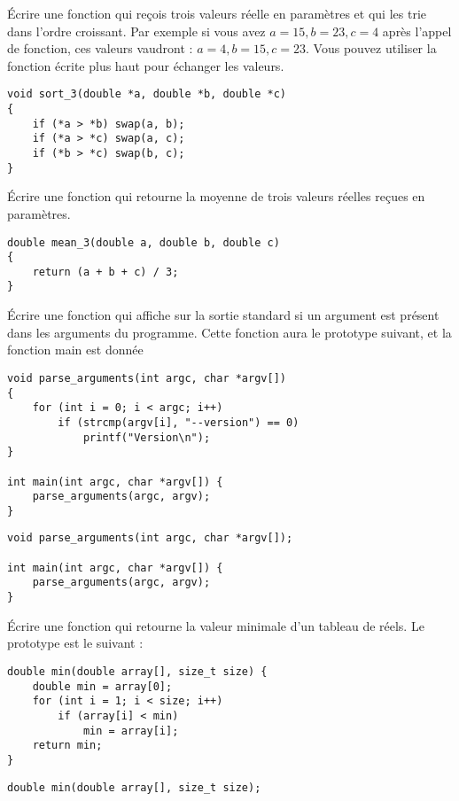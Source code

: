\documentclass[french,a4paper,addpoints,11pt]{exam}
\begin{document}
\begin{questions}
\question Écrire une fonction qui reçois trois valeurs réelle en paramètres et qui les trie dans l'ordre croissant. Par exemple si vous avez $a=15, b=23, c=4$ après l'appel de fonction, ces valeurs vaudront : $a=4, b=15, c=23$. Vous pouvez utiliser la fonction  écrite plus haut pour échanger les valeurs.

\begin{solutionordottedlines}[7cm]
\begin{lstlisting}
void sort_3(double *a, double *b, double *c)
{
    if (*a > *b) swap(a, b);
    if (*a > *c) swap(a, c);
    if (*b > *c) swap(b, c);
}
\end{lstlisting}
\end{solutionordottedlines}

\question Écrire une fonction qui retourne la moyenne de trois valeurs réelles reçues en paramètres. 

\begin{solutionordottedlines}[6cm]
\begin{lstlisting}
double mean_3(double a, double b, double c)
{
    return (a + b + c) / 3;
}
\end{lstlisting}
\end{solutionordottedlines}

\question Écrire une fonction qui affiche  sur la sortie standard si un argument  est présent dans les arguments du programme. Cette fonction aura le prototype suivant, et la fonction main est donnée

\ifprintanswers
\begin{solution}
\begin{lstlisting}
void parse_arguments(int argc, char *argv[])
{
    for (int i = 0; i < argc; i++)
        if (strcmp(argv[i], "--version") == 0)
            printf("Version\n");
}

int main(int argc, char *argv[]) {
    parse_arguments(argc, argv);
}
\end{lstlisting}
\end{solution}
\else
\begin{lstlisting}
void parse_arguments(int argc, char *argv[]);

int main(int argc, char *argv[]) {
    parse_arguments(argc, argv);
}
\end{lstlisting}
\fillwithdottedlines{8cm}
\fi

\question Écrire une fonction qui retourne la valeur minimale d'un tableau de réels. Le prototype est le suivant :

\ifprintanswers
\begin{solution}
\begin{lstlisting}
double min(double array[], size_t size) {
    double min = array[0];
    for (int i = 1; i < size; i++)
        if (array[i] < min)
            min = array[i];
    return min;
}
\end{lstlisting}
\end{solution}
\else
\begin{lstlisting}
double min(double array[], size_t size);
\end{lstlisting}
\fillwithdottedlines{8cm}
\fi


\end{questions}
\end{document}
